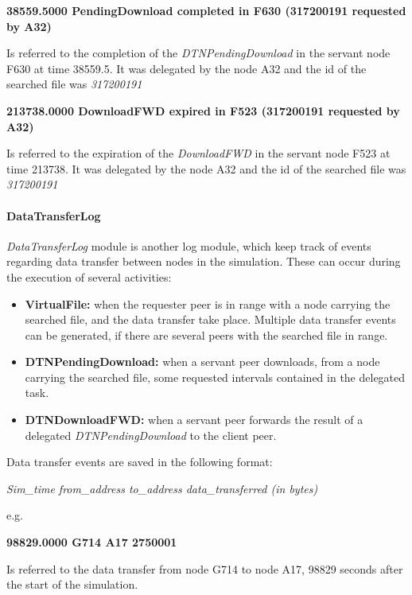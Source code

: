 \begin{center}
\textbf{38559.5000 PendingDownload completed in F630 (317200191 requested by A32)}
\end{center}
Is referred to the completion of the \textit{DTNPendingDownload} in the servant node F630 at time 38559.5. It was delegated by the node A32 and the id of the searched file was \textit{317200191}
\\

\begin{center}
\textbf{213738.0000	DownloadFWD expired in F523 (317200191 requested by A32)}
\end{center}
Is referred to the expiration of the \textit{DownloadFWD} in the servant node F523 at time 213738. It was delegated by the node A32 and the id of the searched file was \textit{317200191}
\\

\paragraph{DataTransferLog}
\textit{DataTransferLog} module is another log module, which keep track of events regarding data transfer between nodes in the simulation. These can occur during the execution of several activities:
\begin{itemize}
\item \textbf{VirtualFile:} when the requester peer is in range with a node carrying the searched file, and the data transfer take place. Multiple data transfer events can be generated, if there are several peers with the searched file in range.
\item \textbf{DTNPendingDownload:} when a servant peer downloads, from a node carrying the searched file, some requested intervals contained in the delegated task.
\item \textbf{DTNDownloadFWD:} when a servant peer forwards the result of a delegated \textit{DTNPendingDownload} to the client peer.
\end{itemize}
Data transfer events are saved in the following format:
\begin{center}
\textit{Sim\_time	from\_address	to\_address	data\_transferred (in bytes)}
\end{center}
e.g.
\begin{center}
\textbf{98829.0000	G714	A17	2750001}
\end{center}
Is referred to the data transfer from node G714 to node A17, 98829 seconds after the start of the simulation.
\\


